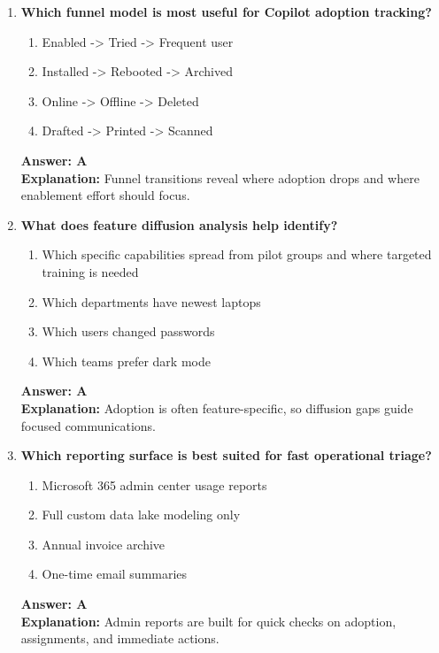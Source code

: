 \documentclass[10pt]{article}
\begin{document}
\begin{enumerate}[leftmargin=*]
\item \textbf{Which funnel model is most useful for Copilot adoption tracking?}
\begin{enumerate}[label=\Alph*.]
  \item Enabled -> Tried -> Frequent user
  \item Installed -> Rebooted -> Archived
  \item Online -> Offline -> Deleted
  \item Drafted -> Printed -> Scanned
\end{enumerate}
\textbf{Answer: A}\\
\textbf{Explanation:} Funnel transitions reveal where adoption drops and where enablement effort should focus.

\item \textbf{What does feature diffusion analysis help identify?}
\begin{enumerate}[label=\Alph*.]
  \item Which specific capabilities spread from pilot groups and where targeted training is needed
  \item Which departments have newest laptops
  \item Which users changed passwords
  \item Which teams prefer dark mode
\end{enumerate}
\textbf{Answer: A}\\
\textbf{Explanation:} Adoption is often feature-specific, so diffusion gaps guide focused communications.

\item \textbf{Which reporting surface is best suited for fast operational triage?}
\begin{enumerate}[label=\Alph*.]
  \item Microsoft 365 admin center usage reports
  \item Full custom data lake modeling only
  \item Annual invoice archive
  \item One-time email summaries
\end{enumerate}
\textbf{Answer: A}\\
\textbf{Explanation:} Admin reports are built for quick checks on adoption, assignments, and immediate actions.

\end{enumerate}


\clearpage
\end{document}
